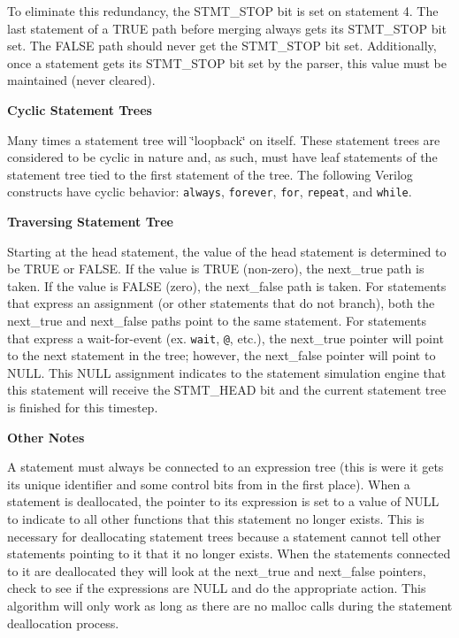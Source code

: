  To eliminate this redundancy, the STMT\_\-STOP bit is set on statement 4. The last statement of a TRUE path before merging always gets its STMT\_\-STOP bit set. The FALSE path should never get the STMT\_\-STOP bit set. Additionally, once a statement gets its STMT\_\-STOP bit set by the parser, this value must be maintained (never cleared).\begin{Desc}
\item[{\bf Cyclic Statement Trees}]\par
 Many times a statement tree will \char`\"{}loopback\char`\"{} on itself. These statement trees are considered to be cyclic in nature and, as such, must have leaf statements of the statement tree tied to the first statement of the tree. The following Verilog constructs have cyclic behavior: {\tt always}, {\tt forever}, {\tt for}, {\tt repeat}, and {\tt while}.\end{Desc}
\begin{Desc}
\item[{\bf Traversing Statement Tree}]\par
 Starting at the head statement, the value of the head statement is determined to be TRUE or FALSE. If the value is TRUE (non-zero), the next\_\-true path is taken. If the value is FALSE (zero), the next\_\-false path is taken. For statements that express an assignment (or other statements that do not branch), both the next\_\-true and next\_\-false paths point to the same statement. For statements that express a wait-for-event (ex. {\tt wait}, {\tt @}, etc.), the next\_\-true pointer will point to the next statement in the tree; however, the next\_\-false pointer will point to NULL. This NULL assignment indicates to the statement simulation engine that this statement will receive the STMT\_\-HEAD bit and the current statement tree is finished for this timestep.\end{Desc}
\begin{Desc}
\item[{\bf Other Notes}]\par
 A statement must always be connected to an expression tree (this is were it gets its unique identifier and some control bits from in the first place). When a statement is deallocated, the pointer to its expression is set to a value of NULL to indicate to all other functions that this statement no longer exists. This is necessary for deallocating statement trees because a statement cannot tell other statements pointing to it that it no longer exists. When the statements connected to it are deallocated they will look at the next\_\-true and next\_\-false pointers, check to see if the expressions are NULL and do the appropriate action. This algorithm will only work as long as there are no malloc calls during the statement deallocation process.

\end{Desc}


